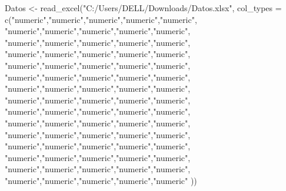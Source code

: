 \documentclass[
  us-letterpaper,
]{scrreprt}
\newenvironment{Shaded}{\begin{snugshade}}{\end{snugshade}}
\newcommand{\AttributeTok}[1]{\textcolor[rgb]{0.40,0.45,0.13}{#1}}
\newcommand{\FunctionTok}[1]{\textcolor[rgb]{0.28,0.35,0.67}{#1}}
\newcommand{\NormalTok}[1]{\textcolor[rgb]{0.00,0.23,0.31}{#1}}
\newcommand{\OtherTok}[1]{\textcolor[rgb]{0.00,0.23,0.31}{#1}}
\newcommand{\StringTok}[1]{\textcolor[rgb]{0.13,0.47,0.30}{#1}}
\theoremstyle{plain}
\theoremstyle{plain}
\theoremstyle{definition}
\theoremstyle{remark}
\begin{document}
\begin{Shaded}
\begin{Highlighting}[]
\NormalTok{Datos }\OtherTok{\textless{}{-}} \FunctionTok{read\_excel}\NormalTok{(}\StringTok{"C:/Users/DELL/Downloads/Datos.xlsx"}\NormalTok{, }
    \AttributeTok{col\_types =} 
\FunctionTok{c}\NormalTok{(}\StringTok{"numeric"}\NormalTok{,}\StringTok{"numeric"}\NormalTok{,}\StringTok{"numeric"}\NormalTok{,}\StringTok{"numeric"}\NormalTok{,}\StringTok{"numeric"}\NormalTok{,}
                    \StringTok{"numeric"}\NormalTok{,}\StringTok{"numeric"}\NormalTok{,}\StringTok{"numeric"}\NormalTok{,}\StringTok{"numeric"}\NormalTok{,}\StringTok{"numeric"}\NormalTok{, }
                    \StringTok{"numeric"}\NormalTok{,}\StringTok{"numeric"}\NormalTok{,}\StringTok{"numeric"}\NormalTok{,}\StringTok{"numeric"}\NormalTok{,}\StringTok{"numeric"}\NormalTok{, }
                    \StringTok{"numeric"}\NormalTok{,}\StringTok{"numeric"}\NormalTok{,}\StringTok{"numeric"}\NormalTok{,}\StringTok{"numeric"}\NormalTok{,}\StringTok{"numeric"}\NormalTok{, }
                    \StringTok{"numeric"}\NormalTok{,}\StringTok{"numeric"}\NormalTok{,}\StringTok{"numeric"}\NormalTok{,}\StringTok{"numeric"}\NormalTok{,}\StringTok{"numeric"}\NormalTok{, }
                    \StringTok{"numeric"}\NormalTok{,}\StringTok{"numeric"}\NormalTok{,}\StringTok{"numeric"}\NormalTok{,}\StringTok{"numeric"}\NormalTok{,}\StringTok{"numeric"}\NormalTok{, }
                    \StringTok{"numeric"}\NormalTok{,}\StringTok{"numeric"}\NormalTok{,}\StringTok{"numeric"}\NormalTok{,}\StringTok{"numeric"}\NormalTok{,}\StringTok{"numeric"}\NormalTok{, }
                    \StringTok{"numeric"}\NormalTok{,}\StringTok{"numeric"}\NormalTok{,}\StringTok{"numeric"}\NormalTok{,}\StringTok{"numeric"}\NormalTok{,}\StringTok{"numeric"}\NormalTok{, }
                    \StringTok{"numeric"}\NormalTok{,}\StringTok{"numeric"}\NormalTok{,}\StringTok{"numeric"}\NormalTok{,}\StringTok{"numeric"}\NormalTok{,}\StringTok{"numeric"}\NormalTok{,}
                    \StringTok{"numeric"}\NormalTok{,}\StringTok{"numeric"}\NormalTok{,}\StringTok{"numeric"}\NormalTok{,}\StringTok{"numeric"}\NormalTok{,}\StringTok{"numeric"}\NormalTok{, }
                    \StringTok{"numeric"}\NormalTok{,}\StringTok{"numeric"}\NormalTok{,}\StringTok{"numeric"}\NormalTok{,}\StringTok{"numeric"}\NormalTok{,}\StringTok{"numeric"}\NormalTok{, }
                    \StringTok{"numeric"}\NormalTok{,}\StringTok{"numeric"}\NormalTok{,}\StringTok{"numeric"}\NormalTok{,}\StringTok{"numeric"}\NormalTok{,}\StringTok{"numeric"}\NormalTok{, }
                    \StringTok{"numeric"}\NormalTok{,}\StringTok{"numeric"}\NormalTok{,}\StringTok{"numeric"}\NormalTok{,}\StringTok{"numeric"}\NormalTok{,}\StringTok{"numeric"}\NormalTok{, }
                    \StringTok{"numeric"}\NormalTok{,}\StringTok{"numeric"}\NormalTok{,}\StringTok{"numeric"}\NormalTok{,}\StringTok{"numeric"}\NormalTok{,}\StringTok{"numeric"}\NormalTok{, }
                    \StringTok{"numeric"}\NormalTok{,}\StringTok{"numeric"}\NormalTok{,}\StringTok{"numeric"}\NormalTok{,}\StringTok{"numeric"}\NormalTok{,}\StringTok{"numeric"}
\NormalTok{                        ))}


\end{Highlighting}
\end{Shaded}
\end{document}

